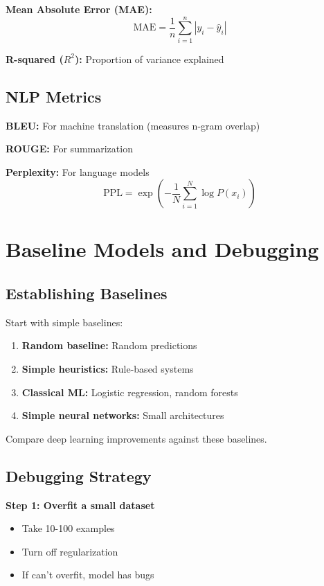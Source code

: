 \textbf{Mean Absolute Error (MAE):}
\begin{equation}
\text{MAE} = \frac{1}{n} \sum_{i=1}^{n} |y_i - \hat{y}_i|
\end{equation}

\textbf{R-squared ($R^2$):} Proportion of variance explained

\subsection{NLP Metrics}

\textbf{BLEU:} For machine translation (measures n-gram overlap)

\textbf{ROUGE:} For summarization

\textbf{Perplexity:} For language models
\begin{equation}
\text{PPL} = \exp\left(-\frac{1}{N} \sum_{i=1}^{N} \log P(x_i)\right)
\end{equation}

\section{Baseline Models and Debugging}
\label{sec:baselines-debugging}

\subsection{Establishing Baselines}

Start with simple baselines:
\begin{enumerate}
    \item \textbf{Random baseline:} Random predictions
    \item \textbf{Simple heuristics:} Rule-based systems
    \item \textbf{Classical ML:} Logistic regression, random forests
    \item \textbf{Simple neural networks:} Small architectures
\end{enumerate}

Compare deep learning improvements against these baselines.

\subsection{Debugging Strategy}

\textbf{Step 1: Overfit a small dataset}
\begin{itemize}
    \item Take 10-100 examples
    \item Turn off regularization
    \item If can't overfit, model has bugs
\end{itemize}

